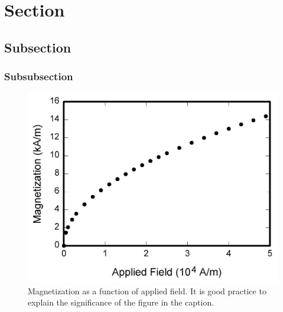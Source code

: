 \documentclass[journal,twoside,web]{ieeecolor}
\begin{document}
\section{Section}
\subsection{Subsection}
\subsubsection{Subsubsection}


\begin{figure}[!t]
    \centerline{\includegraphics[width=\columnwidth]{fig1.png}}
    \caption{Magnetization as a function of applied field.
    It is good practice to explain the significance of the figure in the caption.}
    \label{fig:fig1}
\end{figure}
\end{document}
